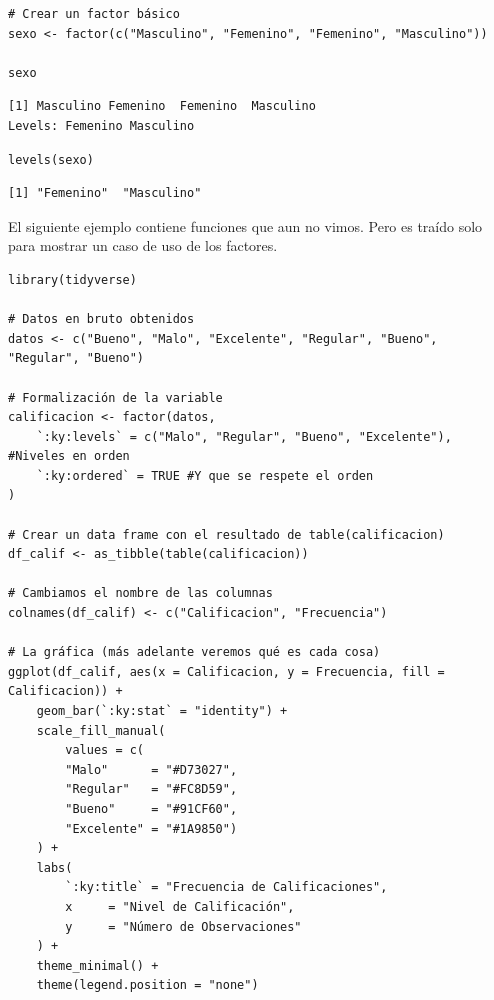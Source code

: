 \documentclass[8pt]{beamer}
\begin{document}
	
	
	\begin{frame}[fragile]
\begin{lstlisting}[style=RScript]
# Crear un factor básico
sexo <- factor(c("Masculino", "Femenino", "Femenino", "Masculino"))

sexo
\end{lstlisting}
\begin{lstlisting}[style=RConsole]
[1] Masculino Femenino  Femenino  Masculino
Levels: Femenino Masculino
\end{lstlisting}
\begin{lstlisting}[style=RScript]
levels(sexo)
\end{lstlisting}
\begin{lstlisting}[style=RConsole]
[1] "Femenino"  "Masculino"
\end{lstlisting}

El siguiente ejemplo contiene funciones que aun no vimos. Pero es traído solo para mostrar un caso de uso de los factores.
	\end{frame}
	
	
	\begin{frame}[fragile]
\begin{lstlisting}[style=RScript]
library(tidyverse)

# Datos en bruto obtenidos
datos <- c("Bueno", "Malo", "Excelente", "Regular", "Bueno", "Regular", "Bueno")

# Formalización de la variable
calificacion <- factor(datos,
	`:ky:levels` = c("Malo", "Regular", "Bueno", "Excelente"), #Niveles en orden
	`:ky:ordered` = TRUE #Y que se respete el orden
)

# Crear un data frame con el resultado de table(calificacion)
df_calif <- as_tibble(table(calificacion))

# Cambiamos el nombre de las columnas
colnames(df_calif) <- c("Calificacion", "Frecuencia")

# La gráfica (más adelante veremos qué es cada cosa)
ggplot(df_calif, aes(x = Calificacion, y = Frecuencia, fill = Calificacion)) +
	geom_bar(`:ky:stat` = "identity") +
	scale_fill_manual(
		values = c(
		"Malo"      = "#D73027", 
		"Regular"   = "#FC8D59", 
		"Bueno"     = "#91CF60", 
		"Excelente" = "#1A9850")
	) +
	labs(
		`:ky:title` = "Frecuencia de Calificaciones",
		x     = "Nivel de Calificación",
		y     = "Número de Observaciones"
	) +
	theme_minimal() +
	theme(legend.position = "none")
\end{lstlisting}
	\end{frame}
	
\end{document}
